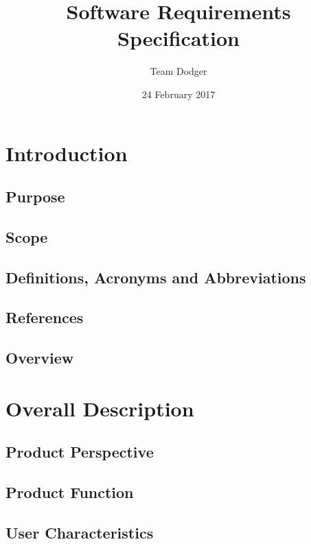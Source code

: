 \documentclass{article}
\title{Software Requirements Specification}
\date{24 February 2017}
\author{Team Dodger}
\begin{document}
	\maketitle
	\newpage
	\tableofcontents
	\newpage
	
	\section{Introduction}
	\subsection{Purpose}
	\subsection{Scope}
	\subsection{Definitions, Acronyms and Abbreviations}
	\subsection{References}
	\subsection{Overview}
	
	\section{Overall Description}
	\subsection{Product Perspective}
	\subsection{Product Function}
	\subsection{User Characteristics}
\end{document}
